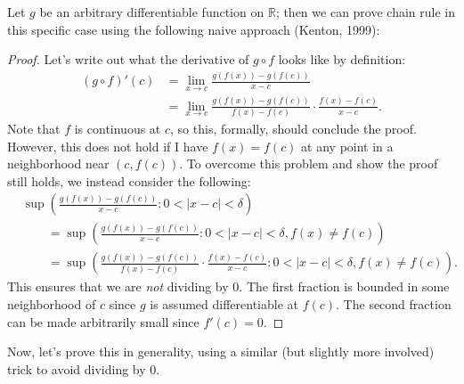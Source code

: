 \documentclass{ximera}
\begin{document}
Let $g$ be an arbitrary differentiable function on $\mathbb{R}$; then we can prove chain rule in this specific case using the following naive approach (Kenton, 1999):
\begin{proof}
    Let's write out what the derivative of $g\circ f$ looks like by definition:
    \begin{align*}
        (g\circ f)'(c) &= \lim\limits_{x\to c} \frac{g(f(x)) - g(f(c))}{x-c}
        \\
        &= \lim\limits_{x\to c} \frac{g(f(x)) - g(f(c))}{f(x)-f(c)}\cdot \frac{f(x) - f(c)}{x-c}.
    \end{align*}
    Note that $f$ is continuous at $c$, so this, formally, should conclude the proof.  However, this does not hold if I have $f(x) = f(c)$ at any point in a neighborhood near $(c,f(c))$.  To overcome this problem and show the proof still holds, we instead consider the following:
    \begin{align*}
        &\sup \left( \frac{g(f(x)) - g(f(c))}{x-c} :0 < |x-c| < \delta  \right)
        \\
        &\qquad = \sup \left( \frac{g(f(x)) - g(f(c))}{x-c} :0 < |x-c| < \delta, f(x) \neq f(c) \right)
        \\
        &\qquad  = \sup \left( \frac{g(f(x)) - g(f(c))}{f(x)-f(c)}\cdot \frac{f(x) - f(c)}{x-c} :0 < |x-c| < \delta, f(x) \neq f(c) \right).
    \end{align*}
    This ensures that we are \textit{not} dividing  by $0$.  The first fraction is bounded in some neighborhood of $c$ since $g$ is assumed differentiable at $f(c)$.  The second fraction can be made arbitrarily small since $f'(c) = 0$.
\end{proof}

Now, let's prove this in generality, using a similar (but slightly more involved) trick to avoid dividing by $0$.
\end{document}
